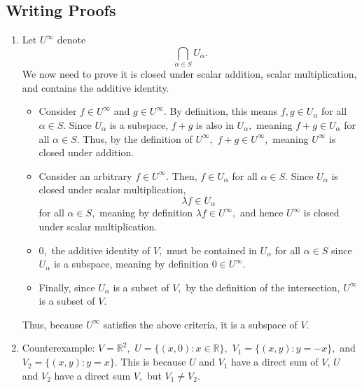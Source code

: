 \documentclass[12pt]{article}
\begin{document}
\subsection{Writing Proofs}
\begin{enumerate}
  \item Let $U^{\infty}$ denote $$\bigcap_{\alpha \in S}
    U_{\alpha}.$$ We now need to prove it is closed under scalar
    addition, scalar multiplication, and contains the additive identity.

    \begin{itemize}
      \item Consider $f \in U^{\infty}$ and $g \in U^{\infty}.$ By
        definition, this means $f, g \in U_{\alpha}$ for all $\alpha
        \in S.$ Since $U_{\alpha}$ is a subspace, $f + g$ is also in
        $U_{\alpha},$ meaning $f + g \in U_{\alpha}$ for all $\alpha
        \in S.$ Thus, by the definition of $U^{\infty},$ $f + g \in
        U^{\infty},$ meaning $U^{\infty}$ is closed under addition.
      \item Consider an arbitrary $f \in U^{\infty}.$ Then, $f \in
        U_{\alpha}$ for all $\alpha \in S.$ Since $U_\alpha$ is
        closed under scalar multiplication, $$\lambda f \in
        U_\alpha$$ for all $\alpha \in S,$ meaning by definition
        $\lambda f \in U^{\infty},$ and hence $U^{\infty}$ is closed
        under scalar multiplication.

      \item $0,$ the additive identity of $V,$ must be contained in
        $U_\alpha$ for all $\alpha \in S$ since $U_\alpha$ is a
        subspace, meaning by definition $0 \in U^{\infty}.$

      \item Finally, since $U_{\alpha}$ is a subset of $V,$ by the
        definition of the intersection, $U^{\infty}$ is a subset of $V.$
    \end{itemize}

    Thus, because $U^{\infty}$ satisfies the above criteria, it is a
    subspace of $V.$

  \item Counterexample: $V = \mathbb R^{2},$ $U = \{(x, 0) : x \in
    \mathbb R \},$ $V_1 = \{(x, y) : y = -x\},$ and $V_2 = \{(x, y) :
    y=x\}.$ This is because $U$ and $V_1$ have a direct sum of $V$,
    $U$ and $V_2$ have a direct sum $V,$ but $V_1 \neq V_2.$


\end{enumerate}
\end{document}
